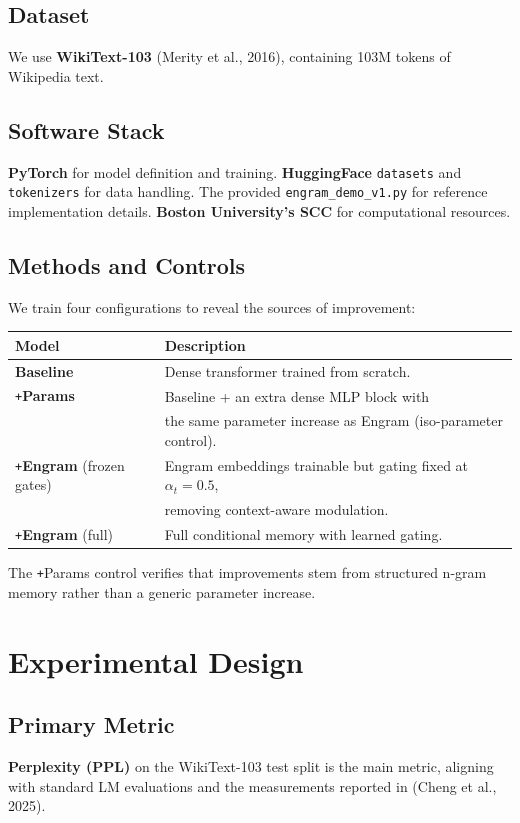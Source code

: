 \documentclass[11pt]{article}
\begin{document}
\subsection{Dataset}
We use \textbf{WikiText-103} (Merity et al., 2016), containing 103M tokens of Wikipedia text. 

\subsection{Software Stack}
\textbf{PyTorch} for model definition and training. \textbf{HuggingFace} \texttt{datasets} and \texttt{tokenizers} for data handling. The provided \texttt{engram\_demo\_v1.py} for reference implementation details. \textbf{Boston University's SCC} for computational resources.

\subsection{Methods and Controls}
We train four configurations to reveal the sources of improvement:
\begin{center}
\begin{tabular}{ll}
\toprule
Model & Description \\
\midrule
\textbf{Baseline} & Dense transformer trained from scratch. \\
\texttt{+}\textbf{Params} & Baseline + an extra dense MLP block with \\
                & the same parameter increase as Engram (iso-parameter control). \\
\texttt{+}\textbf{Engram} (frozen gates) & Engram embeddings trainable but gating fixed at $\alpha_t = 0.5$, \\
                                        & removing context-aware modulation. \\
\texttt{+}\textbf{Engram} (full) & Full conditional memory with learned gating. \\
\bottomrule
\end{tabular}
\end{center}
The \texttt{+}Params control verifies that improvements stem from structured n-gram memory rather than a generic parameter increase.

\section{Experimental Design}
\subsection{Primary Metric}
\textbf{Perplexity (PPL)} on the WikiText-103 test split is the main metric, aligning with standard LM evaluations and the measurements reported in (Cheng et al., 2025).
\end{document}
